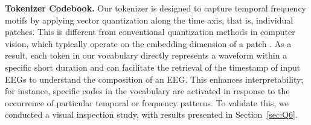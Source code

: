 


\noindent\textbf{Tokenizer Codebook. } 
Our tokenizer is designed to capture temporal frequency motifs by applying vector quantization along the time axis, that is, individual patches.
This is different from conventional quantization methods in computer vision, which typically operate on the embedding dimension of a patch \cite{van2017neural, esser2020taming}.
As a result, each token in our vocabulary directly represents a waveform within a specific short duration and can facilitate the retrieval of the timestamp of input EEGs to understand the composition of an EEG.
This enhances interpretability; for instance, specific codes in the vocabulary are activated in response to the occurrence of particular temporal or frequency patterns.
To validate this, we conducted a visual inspection study, with results presented in Section~\ref{sec:Q6}. \\




